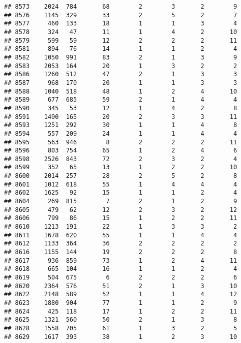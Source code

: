 \documentclass[]{article}
\begin{document}
\begin{verbatim}
## 8573    2024  784       68        2        3       2        9
## 8576    1145  329       33        2        5       2        7
## 8577     460  133       18        1        1       3        4
## 8578     324   47       11        1        4       2       10
## 8579     599   59       12        2        2       2       11
## 8581     894   76       14        1        1       2        4
## 8582    1050  991       83        2        1       3        9
## 8583    2053  164       20        1        3       2        2
## 8586    1260  512       47        2        1       3        3
## 8587     968  170       20        1        1       3        3
## 8588    1040  518       48        1        2       4       10
## 8589     677  685       59        2        1       4        4
## 8590     345   53       12        1        4       2        8
## 8591    1490  165       20        2        3       3       11
## 8593    1251  292       30        1        1       4        8
## 8594     557  209       24        1        1       4        4
## 8595     563  946        8        2        2       2       11
## 8596     803  754       65        1        2       4        6
## 8598    2526  843       72        2        3       2        4
## 8599     352   65       13        1        2       2       10
## 8600    2014  257       28        2        5       2        8
## 8601    1012  618       55        1        4       4        4
## 8602    1625   92       15        1        1       2        4
## 8604     269  815        7        2        1       2        9
## 8605     479   62       12        2        3       2       12
## 8606     799   86       15        1        2       2       11
## 8610    1213  191       22        1        3       3        2
## 8611    1678  620       55        1        1       4        4
## 8612    1133  364       36        2        2       2        2
## 8616    1155  144       19        2        2       2        8
## 8617     936  859       73        1        2       4       11
## 8618     665  104       16        1        1       2        4
## 8619     504  675        6        2        2       2        6
## 8620    2364  576       51        2        1       3       10
## 8622    2148  589       52        1        1       4       12
## 8623    1880  904       77        1        1       2        9
## 8624     425  118       17        1        2       2       11
## 8625    1321  560       50        2        1       3        8
## 8628    1558  705       61        1        3       2        5
## 8629    1617  393       38        1        2       3       10

\end{verbatim}
\end{document}
